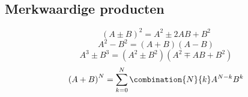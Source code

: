 \subsection{Merkwaardige producten}
\label{sec:MerkwProd}
\[
  \left(A \pm B\right)^2 = A^2 \pm 2 AB + B^2
\]
\[
  A^2 - B^2 = \left(A+B\right)\left(A-B\right)
\]
\[
  A^3 \pm B^3 = \left(A^2 \pm B^2\right)\left(A^2 \mp AB + B^2 \right)
\]
\[
  \left(A + B\right)^N = \sum_{k=0}^N \combination{N}{k} A^{N-k}B^k
\]
